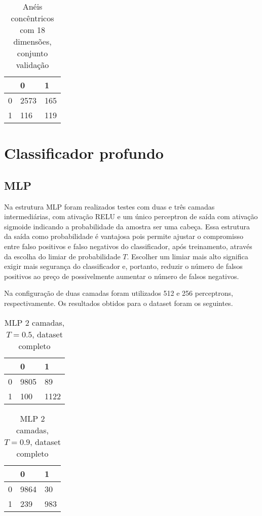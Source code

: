 \begin{table}[h!]
\centering
\caption{Anéis concêntricos com 18 dimensões, conjunto validação}
\begin{tabular}{l|l|l|}
\cline{2-3}
                        & 0 & 1 \\ \hline
\multicolumn{1}{|l|}{0} & 2573 & 165 \\ \hline
\multicolumn{1}{|l|}{1} & 116  & 119 \\ \hline
\end{tabular}
\end{table}

\section{Classificador profundo}

\subsection{MLP}
Na estrutura MLP foram realizados testes com duas e três camadas intermediárias, com ativação RELU e um único perceptron de saída com ativação sigmoide indicando a probabilidade da amostra ser uma cabeça. Essa estrutura da saída como probabilidade é vantajosa pois permite ajustar o compromisso entre falso positivos e falso negativos do classificador, após treinamento, através da escolha do limiar de probabilidade $T$. Escolher um limiar mais alto significa exigir mais segurança do classificador e, portanto, reduzir o número de falsos positivos ao preço de possivelmente aumentar o número de falsos negativos.

Na configuração de duas camadas foram utilizados 512 e 256 perceptrons, respectivamente. Os resultados obtidos para o dataset foram os seguintes.
\begin{table}[h!]
\centering
\caption{MLP 2 camadas, $T=0.5$, dataset completo}
\begin{tabular}{l|l|l|}
\cline{2-3}
                        & 0 & 1 \\ \hline
\multicolumn{1}{|l|}{0} & 9805 & 89 \\ \hline
\multicolumn{1}{|l|}{1} & 100  & 1122 \\ \hline
\end{tabular}
\end{table}

\begin{table}[h!]
\centering
\caption{MLP 2 camadas, $T=0.9$, dataset completo}
\begin{tabular}{l|l|l|}
\cline{2-3}
                        & 0 & 1 \\ \hline
\multicolumn{1}{|l|}{0} & 9864 & 30 \\ \hline
\multicolumn{1}{|l|}{1} & 239  & 983 \\ \hline
\end{tabular}
\end{table}

